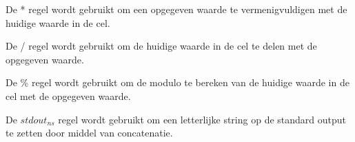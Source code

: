 \documentclass[11pt]{article}
\begin{document}
\begin{prooftree}
\end{prooftree}
De * regel wordt gebruikt om een opgegeven waarde te vermenigvuldigen met de huidige waarde in de cel.
\begin{prooftree}
\end{prooftree}

\begin{prooftree}
\end{prooftree}

De / regel wordt gebruikt om de huidige waarde in de cel te delen met de opgegeven waarde.
\begin{prooftree}
\end{prooftree}

\begin{prooftree}
\end{prooftree}

De \% regel wordt gebruikt om de modulo te bereken van de huidige waarde in de cel met de opgegeven waarde.
\begin{prooftree}
\end{prooftree}

\begin{prooftree}
\end{prooftree}



De $stdout_{ns}$ regel wordt gebruikt om een letterlijke string op de standard output te zetten door middel van concatenatie.
\begin{prooftree}
\end{prooftree}
\end{document}
